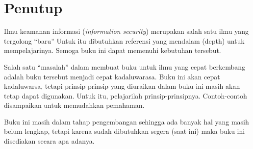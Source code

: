 \chapter{Penutup}
Ilmu keamanan informasi ({\em information security}) merupakan salah satu ilmu
yang tergolong ``baru'' Untuk itu dibutuhkan referensi yang mendalam (depth)
untuk mempelajarinya. Semoga buku ini dapat memenuhi kebutuhan tersebut.

Salah satu ``masalah'' dalam membuat buku untuk ilmu yang cepat berkembang
adalah buku tersebut menjadi cepat kadaluwarasa. Buku ini akan cepat
kadaluwarsa, tetapi prinsip-prinsip yang diuraikan dalam buku ini masih akan
tetap dapat digunakan. Untuk itu, pelajarilah prinsip-prinsipnya. Contoh-contoh
disampaikan untuk memudahkan pemahaman.

Buku ini masih dalam tahap pengembangan sehingga ada banyak hal yang masih
belum lengkap, tetapi karena sudah dibutuhkan segera (saat ini) maka buku ini
disediakan secara apa adanya.
